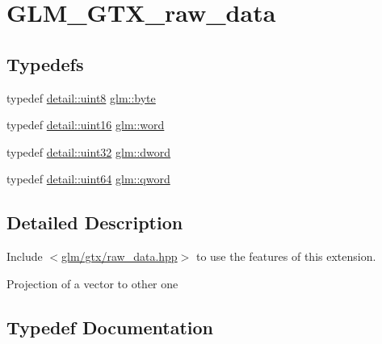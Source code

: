 \hypertarget{group__gtx__raw__data}{}\section{G\+L\+M\+\_\+\+G\+T\+X\+\_\+raw\+\_\+data}
\label{group__gtx__raw__data}
\subsection*{Typedefs}
\begin{DoxyCompactItemize}
\item 
typedef \mbox{\hyperlink{namespaceglm_1_1detail_aef2588f97d090cc19fbbe0c74fe17c8f}{detail\+::uint8}} \mbox{\hyperlink{group__gtx__raw__data_gacd7fe1f2ad60a57f7d7ad4f1e6836efd}{glm\+::byte}}
\item 
typedef \mbox{\hyperlink{namespaceglm_1_1detail_a47b2a7d006d187338e8031a352d1ce56}{detail\+::uint16}} \mbox{\hyperlink{group__gtx__raw__data_ga5617a479d471021b5c773c5e969ba46d}{glm\+::word}}
\item 
typedef \mbox{\hyperlink{namespaceglm_1_1detail_ade6cfbf377022aaa391af8cd50489222}{detail\+::uint32}} \mbox{\hyperlink{group__gtx__raw__data_ga1fc2589df6d44e923cd1820cf14805cf}{glm\+::dword}}
\item 
typedef \mbox{\hyperlink{namespaceglm_1_1detail_adec4b19bf4982125e122db2fe03c5810}{detail\+::uint64}} \mbox{\hyperlink{group__gtx__raw__data_ga32447af289e879589883c9b7e3be1246}{glm\+::qword}}
\end{DoxyCompactItemize}


\subsection{Detailed Description}
Include $<$\mbox{\hyperlink{raw__data_8hpp}{glm/gtx/raw\+\_\+data.\+hpp}}$>$ to use the features of this extension.

Projection of a vector to other one 

\subsection{Typedef Documentation}
\mbox{\label{group__gtx__raw__data_gacd7fe1f2ad60a57f7d7ad4f1e6836efd}} 
